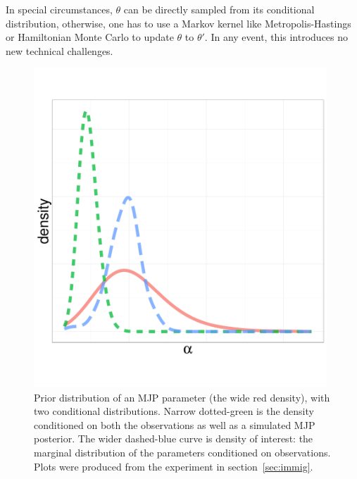 In special circumstances, $\theta$ can be directly sampled from its 
conditional distribution, otherwise, one has to use a Markov kernel like
Metropolis-Hastings or Hamiltonian Monte Carlo to update $\theta$ to 
$\theta'$. In any event, this introduces no new technical challenges.
  \begin{figure}%
  \centering
  \begin{minipage}[hp]{0.35\linewidth}
  \centering
    \vspace{-0 in}
    \includegraphics [width=0.98\textwidth, angle=0]{figs/dist_beta.pdf}
  \end{minipage}
  \begin{minipage}[hp]{0.64\linewidth}
  \caption{Prior distribution of an MJP parameter (the wide red density), with two conditional distributions. 
    Narrow dotted-green is the density conditioned on both the observations as well as a simulated MJP posterior. 
    The wider dashed-blue curve is density of interest: the marginal distribution of the parameters conditioned on observations. 
  Plots were produced from the experiment in section~\ref{sec:immig}.}
     \label{fig:hist}
  \end{minipage}
  \end{figure}
